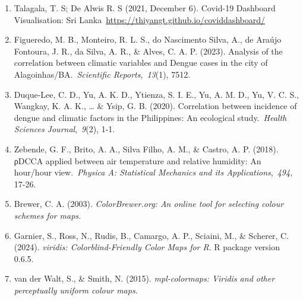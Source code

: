 \documentclass[
  letterpaper,
  DIV=11,
  numbers=noendperiod]{scrartcl}
\begin{document}
\begin{enumerate}
\def\labelenumi{\arabic{enumi}.}
\item
  Talagala, T. S; De Alwis R. S (2021, December 6). Covid-19 Dashboard
  Visualisation: Sri
  Lanka~\url{https://thiyangt.github.io/coviddashboard/}
\item
  Figueredo, M. B., Monteiro, R. L. S., do Nascimento Silva, A., de
  Araújo Fontoura, J. R., da Silva, A. R., \& Alves, C. A. P. (2023).
  Analysis of the correlation between climatic variables and Dengue
  cases in the city of Alagoinhas/BA.~\emph{Scientific
  Reports},~\emph{13}(1), 7512.
\item
  Duque-Lee, C. D., Yu, A. K. D., Ytienza, S. I. E., Yu, A. M. D., Yu,
  V. C. S., Wangkay, K. A. K., \ldots{} \& Ysip, G. B. (2020).
  Correlation between incidence of dengue and climatic factors in the
  Philippines: An ecological study.~\emph{Health Sciences
  Journal},~\emph{9}(2), 1-1.
\item
  Zebende, G. F., Brito, A. A., Silva Filho, A. M., \& Castro, A. P.
  (2018). ρDCCA applied between air temperature and relative humidity:
  An hour/hour view.~\emph{Physica A: Statistical Mechanics and its
  Applications},~\emph{494}, 17-26.
\item
  Brewer, C. A. (2003). \emph{ColorBrewer.org: An online tool for
  selecting colour schemes for maps.}
\item
  Garnier, S., Ross, N., Rudis, B., Camargo, A. P., Sciaini, M., \&
  Scherer, C. (2024). \emph{viridis: Colorblind-Friendly Color Maps for
  R}. R package version 0.6.5.
\item
  van der Walt, S., \& Smith, N. (2015). \emph{mpl-colormaps: Viridis
  and other perceptually uniform colour maps.}
\end{enumerate}
\end{document}
